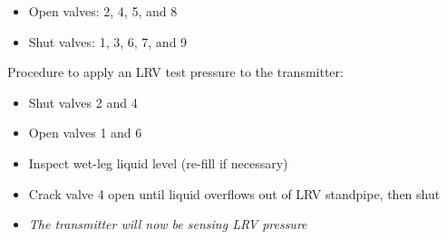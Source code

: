 \begin{itemize}
\item{} Open valves: 2, 4, 5, and 8
\item{} Shut valves: 1, 3, 6, 7, and 9
\end{itemize}

\vskip 10pt

Procedure to apply an LRV test pressure to the transmitter:

\begin{itemize}
\item{} Shut valves 2 and 4
\item{} Open valves 1 and 6
\item{} Inspect wet-leg liquid level (re-fill if necessary)
\item{} Crack valve 4 open until liquid overflows out of LRV standpipe, then shut
\item{} {\it The transmitter will now be sensing LRV pressure}
\end{itemize}












